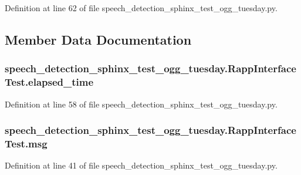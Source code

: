 Definition at line 62 of file speech\-\_\-detection\-\_\-sphinx\-\_\-test\-\_\-ogg\-\_\-tuesday.\-py.



\subsection{Member Data Documentation}
\hypertarget{classspeech__detection__sphinx__test__ogg__tuesday_1_1RappInterfaceTest_a7489f4e4554c48afd803a3cee91c96af}{
\subsubsection[{elapsed\-\_\-time}]{\setlength{\rightskip}{0pt plus 5cm}speech\-\_\-detection\-\_\-sphinx\-\_\-test\-\_\-ogg\-\_\-tuesday.\-Rapp\-Interface\-Test.\-elapsed\-\_\-time}}\label{classspeech__detection__sphinx__test__ogg__tuesday_1_1RappInterfaceTest_a7489f4e4554c48afd803a3cee91c96af}


Definition at line 58 of file speech\-\_\-detection\-\_\-sphinx\-\_\-test\-\_\-ogg\-\_\-tuesday.\-py.

\hypertarget{classspeech__detection__sphinx__test__ogg__tuesday_1_1RappInterfaceTest_ae1d9f478acb47d2fdfbd0ccfb475d7b4}{
\subsubsection[{msg}]{\setlength{\rightskip}{0pt plus 5cm}speech\-\_\-detection\-\_\-sphinx\-\_\-test\-\_\-ogg\-\_\-tuesday.\-Rapp\-Interface\-Test.\-msg}}\label{classspeech__detection__sphinx__test__ogg__tuesday_1_1RappInterfaceTest_ae1d9f478acb47d2fdfbd0ccfb475d7b4}


Definition at line 41 of file speech\-\_\-detection\-\_\-sphinx\-\_\-test\-\_\-ogg\-\_\-tuesday.\-py.

